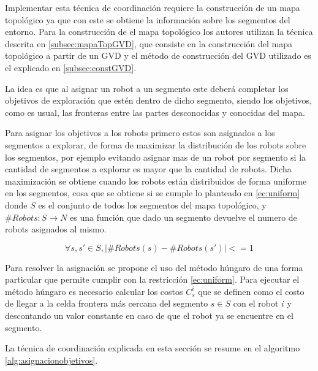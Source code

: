 Implementar esta técnica de coordinación requiere la construcción de un mapa topológico ya que con este se obtiene la información sobre los segmentos del entorno. Para la construcción de el mapa topológico los autores utilizan la técnica descrita en \ref{subsec:mapaTopGVD}, que consiste en la construcción del mapa topológico a partir de un GVD y el método de construcción del GVD utilizado es el explicado en \ref{subsec:constGVD}.

La idea es que al asignar un robot a un segmento este deberá completar los objetivos de exploración que estén dentro de dicho segmento, siendo los objetivos, como es usual, las fronteras entre las partes desconocidas y conocidas del mapa. 

Para asignar los objetivos a los robots primero estos son asignados a los segmentos a explorar, de forma de maximizar la distribución de los robots sobre los segmentos, por ejemplo evitando asignar mas de un robot por segmento si la cantidad de segmentos a explorar es mayor que la cantidad de robots. Dicha maximización se obtiene cuando los robots están distribuidos de forma uniforme en los segmentos, cosa que se obtiene si se cumple lo planteado en \eqref{ec:uniform} donde $S$ es el conjunto de todos los segmentos del mapa topológico, y $\#Robots : S \rightarrow N$ es una función que dado un segmento devuelve el numero de robots asignados al mismo. 

\begin{equation}\label{ec:uniform}
  \forall s,s' \in S, |\#Robots(s) - \#Robots(s')| <= 1
\end{equation}

Para resolver la asignación se propone el uso del método húngaro\cite{kuhn1955hungarian} de una forma particular que permite cumplir con la restricción \eqref{ec:uniform}. Para ejecutar el método húngaro es necesario calcular los costos $C_{s}^{i}$ que se definen como el costo de llegar a la celda frontera más cercana del segmento $s \in S$ con el robot $i$ y descontando un valor constante en caso de que el robot ya se encuentre en el segmento. 

La técnica de coordinación explicada en esta sección se resume en el algoritmo \ref{alg:asignacionobjetivos}.

